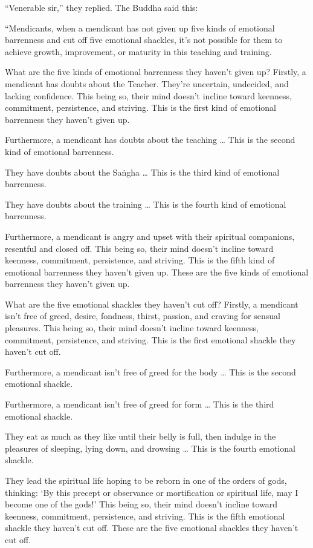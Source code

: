 \documentclass[12pt,openany]{book}%
\begin{document}
“Venerable sir,” they replied. The Buddha said this: 

“Mendicants, when a mendicant has not given up five kinds of emotional barrenness and cut off five emotional shackles, it’s not possible for them to achieve growth, improvement, or maturity in this teaching and training. 

What are the five kinds of emotional barrenness they haven’t given up? Firstly, a mendicant has doubts about the Teacher. They’re uncertain, undecided, and lacking confidence. This being so, their mind doesn’t incline toward keenness, commitment, persistence, and striving. This is the first kind of emotional barrenness they haven’t given up. 

Furthermore, a mendicant has doubts about the teaching … This is the second kind of emotional barrenness. 

They have doubts about the \textsanskrit{Saṅgha} … This is the third kind of emotional barrenness. 

They have doubts about the training … This is the fourth kind of emotional barrenness. 

Furthermore, a mendicant is angry and upset with their spiritual companions, resentful and closed off. This being so, their mind doesn’t incline toward keenness, commitment, persistence, and striving. This is the fifth kind of emotional barrenness they haven’t given up. These are the five kinds of emotional barrenness they haven’t given up. 

What are the five emotional shackles they haven’t cut off? Firstly, a mendicant isn’t free of greed, desire, fondness, thirst, passion, and craving for sensual pleasures. This being so, their mind doesn’t incline toward keenness, commitment, persistence, and striving. This is the first emotional shackle they haven’t cut off. 

Furthermore, a mendicant isn’t free of greed for the body … This is the second emotional shackle. 

Furthermore, a mendicant isn’t free of greed for form … This is the third emotional shackle. 

They eat as much as they like until their belly is full, then indulge in the pleasures of sleeping, lying down, and drowsing … This is the fourth emotional shackle. 

They lead the spiritual life hoping to be reborn in one of the orders of gods, thinking: ‘By this precept or observance or mortification or spiritual life, may I become one of the gods!’ This being so, their mind doesn’t incline toward keenness, commitment, persistence, and striving. This is the fifth emotional shackle they haven’t cut off. These are the five emotional shackles they haven’t cut off. 
\end{document}
